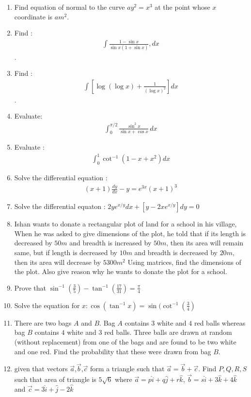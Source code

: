 \documentclass[12pt,-letter paper]{article}
\begin{document}
\begin{enumerate}
\item Find equation of normal to the curve $ay^2=x^3$ at the point whose $x$ coordinate is $am^2$.
\item Find : \begin{align*}\int\frac{1-\sin{x}}{\sin{x}(1+\sin{x})},dx\end{align*}.
\item Find : \begin{align*}\int[\log(\log{x})+\frac{1}{(\log{x})^2}]dx\end{align*}.
	\item Evaluate: \begin{align*}\int_{0}^{\pi/2} \frac{\sin^2 x}{\sin{x} + \cos{x}} \, dx\end{align*} 
\item Evaluate : \begin{align*}\int_{0}^{1}\cot^{-1}(1-x+x^2)dx\end{align*}
	\item Solve the differential equation : \begin{align*}(x+1)\frac{dy}{dx}-y=e^{3x}	(x+1)^3\end{align*}
\item Solve the differential equaton : $2ye^{x/y}dx+[y-2xe^{x/y}]dy=0$
\item Ishan wants to donate a rectangular plot of land for a school in his village, When he was asked to give dimensions of the plot, he told that if its length is decreased by $50 m$ and breadth is increased by $50 m$, then its area will remain same, but if length is decreased by $10 m$ and breadth is decreased by   $20 m$, then its area will decrease by $5300 m ^ 2 $  Using matrices, find the dimensions of the plot. Also give reason why he wants to donate the plot for a school.
\item Prove that $\sin^{-1}(\frac{3}{5})-\tan^{-1}(\frac{17}{31})=\frac{\pi}{4}$
\item Solve the equation for $x:\cos(\tan^{-1}x)=\sin(\cot^{-1}(\frac{3}{4})$
\item There are two bags $A$ and $B$. Bag $A$ contains $3$ white and $4$ red balls whereas bag $B$ contains $4$ white and $3$ red balls. Three balls are drawn at random (without replacement) from one of the bags and are found to be two white and one red. Find the probability that these were drawn from bag $B$.
\item given that vectors $\overset{\rightarrow}{a}$,$\overset{\rightarrow}{b}$,$\overset{\rightarrow}{c}$ form a triangle such that $\overset{\rightarrow}{a}=\overset{\rightarrow}{b}+\overset{\rightarrow}{c}$. Find $P,Q,R,S$ such that area  of triangle is $5\sqrt{6}$ where $\overrightarrow{a}=p\hat{i}+q\hat{j}+r\hat{k}$,  $\overset{\rightarrow}{b}=s\hat{i}+3\hat{k}+4\hat{k}$ and $\overset{\rightarrow}{c}=3\hat{i}+\hat{j}-2\hat{k}$

\end{enumerate}
\end{document}

